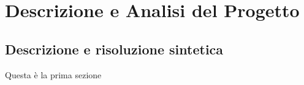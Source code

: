 \chapter{Descrizione e Analisi del Progetto}
\section{Descrizione e risoluzione sintetica}
Questa è la prima sezione